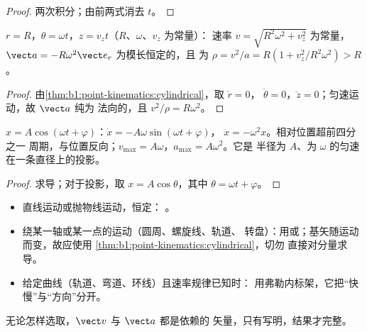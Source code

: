 \begin{proof}
两次积分；由前两式消去 $t$。
\end{proof}

\begin{proposition}[螺旋运动]\label{prop:b1:point-kinematics:helix}
$r = R$，$\theta = \omega t$，$z = v_zt$（$R$、$\omega$、$v_z$ 为常量）：
速率 $v = \sqrt{R^2\omega^2 + v_z^2}$ 为常量，
$\vect a = -R\omega^2\vect e_r$ 为模长恒定的，且
为 $\rho = v^2/a = R(1 + v_z^2/R^2\omega^2) > R$。
\end{proposition}

\begin{proof}
由\cref{thm:b1:point-kinematics:cylindrical}，取 $\dot r = 0$，
$\ddot\theta = 0$，$\ddot z = 0$；匀速运动，故 $\vect a$ 纯为
法向的，且 $v^2/\rho = R\omega^2$。
\end{proof}

\begin{proposition}[简谐运动]\label{prop:b1:point-kinematics:harmonic}
$x = A\cos(\omega t + \varphi)$：$\dot x = -A\omega\sin(\omega t + \varphi)$，
$\ddot x = -\omega^2 x$。相对位置超前四分之一
周期，与位置反向；$v_{\max} =
A\omega$，$a_{\max} = A\omega^2$。它是
半径为 $A$、为 $\omega$ 的匀速在一条直径上的投影。
\end{proposition}

\begin{proof}
求导；对于投影，取 $x = A\cos\theta$，其中 $\theta =
\omega t + \varphi$。
\end{proof}

\begin{method}[选取坐标]\label{met:b1:point-kinematics:choose}
\begin{itemize}
  \item 直线运动或抛物线运动，恒定：
        。
  \item 绕某一轴或某一点的运动（圆周、螺旋线、轨道、
        转盘）：用或；基矢随运动而变，故应使用
        \cref{thm:b1:point-kinematics:cylindrical}，切勿
        直接对分量求导。
  \item 给定曲线（轨道、弯道、环线）且速率规律已知时：
        用弗勒内标架，它把“快慢”与“方向”分开。
\end{itemize}
无论怎样选取，$\vect v$ 与 $\vect a$ 都是依赖的
矢量，只有写明，结果才完整。
\end{method}

